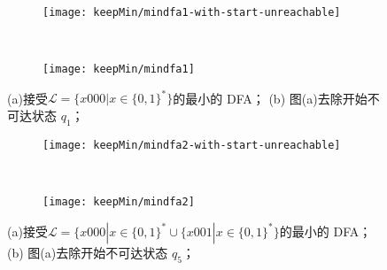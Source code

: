 \begin{figure}[!htbp]
    \centering
    \begin{subfigure}[b]{0.7\textwidth}
        \texttt{[image: keepMin/mindfa1-with-start-unreachable]}
        \caption{}
        \label{fig:keepMin-1-unreachable}
    \end{subfigure}
    \\
    \begin{subfigure}[b]{0.7\textwidth}
        \texttt{[image: keepMin/mindfa1]}
        \caption{}
        \label{fig:keepMin-1-nonTheState}
    \end{subfigure}
    \caption{(a)接受{$\mathcal{L}=\{ x000 | x \in \{ 0,1\}^{*} \}$}的最小的 DFA；  (b) 图(a)去除开始不可达状态 {$q_1$}； }
    \label{fig:keepMin-1}
\end{figure}

\begin{figure}[!htbp]
    \centering
    \begin{subfigure}[b]{0.7\textwidth}
        \texttt{[image: keepMin/mindfa2-with-start-unreachable]}
        \caption{}
        \label{fig:keepMin-2-unreachable}
    \end{subfigure}
    \\
    \begin{subfigure}[b]{0.7\textwidth}
        \texttt{[image: keepMin/mindfa2]}
        \caption{}
        \label{fig:keepMin-2-nonTheState}
    \end{subfigure}
    \caption{(a)接受{$\mathcal{L}=\{ x000 | x \in \{ 0,1\}^{*} \cup \{ x001 | x \in \{ 0,1\}^{*} \}$}的最小的 DFA；  (b) 图(a)去除开始不可达状态 {$q_5$}； }
    \label{fig:keepMin-2}
\end{figure}


